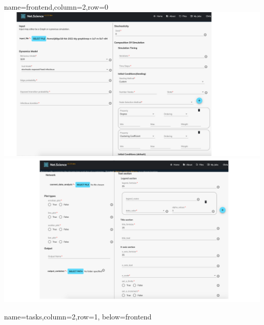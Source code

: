 \documentclass[landscape,a0paper,fontscale=0.285]{baposter} %
\begin{document}
\begin{poster}
          {name=frontend,column=2,row=0}{
\includegraphics[scale=0.3]{figures/csonnet-model-seeds.pdf}
\includegraphics[scale=0.3]{figures/plot_input.pdf}
} 

          {name=tasks,column=2,row=1, below=frontend}{

}
\end{poster}
\end{document}
